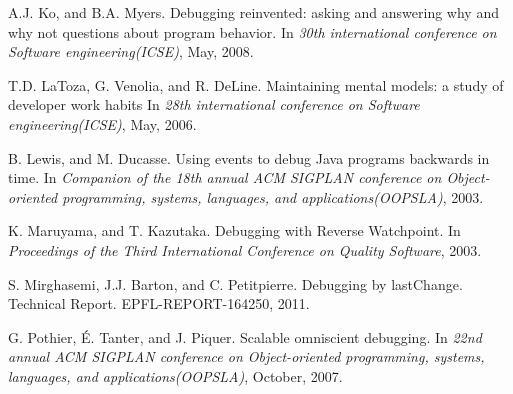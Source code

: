 \documentclass{sig-alternate}
\begin{document}
\begin{thebibliography}{16}

A.J. Ko, and B.A. Myers. \newblock Debugging reinvented: asking and answering why and why not questions about program behavior.
\newblock In \emph{30th international conference on Software engineering(ICSE)},
May, 2008.


T.D. LaToza, G. Venolia, and R. DeLine. \newblock Maintaining mental models: a study of developer work habits
\newblock In \emph{28th international conference on Software engineering(ICSE)},
May, 2006.

B. Lewis, and M. Ducasse. \newblock Using events to debug Java programs backwards in time.
\newblock In \emph{Companion of the 18th annual ACM SIGPLAN conference on Object-oriented programming, systems, languages, and applications(OOPSLA)},
2003.


K. Maruyama, and T. Kazutaka. \newblock Debugging with Reverse Watchpoint.
\newblock In \emph{Proceedings of the Third International Conference on Quality Software},
2003.

S. Mirghasemi, J.J. Barton, and C. Petitpierre. \newblock Debugging by lastChange.
\newblock Technical Report. EPFL-REPORT-164250, 2011. 

G. Pothier, \'{E}. Tanter, and J. Piquer. \newblock Scalable omniscient debugging.
\newblock In \emph{22nd annual ACM SIGPLAN conference on Object-oriented programming, systems, languages, and applications(OOPSLA)},
October, 2007.




\end{thebibliography}


%
%
\end{document}

